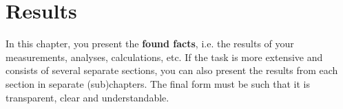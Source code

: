\chapter{Results}\label{cha:results}

In this chapter, you present the \textbf{found facts}, i.e. the results of your measurements, analyses, calculations, etc. If the task is more extensive and consists of several separate sections, you can also present the results from each section in separate (sub)chapters. The final form must be such that it is transparent, clear and understandable.
